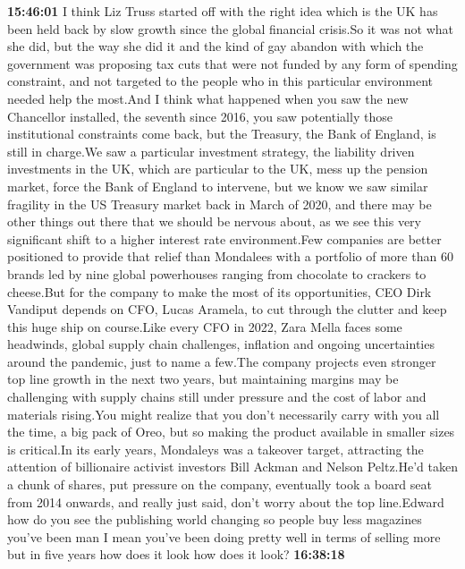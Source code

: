 \documentclass{article}%
\begin{document}
\textbf{15:46:01}%
I think Liz Truss started off with the right idea which is the UK has been held back by slow growth since the global financial crisis.So it was not what she did, but the way she did it and the kind of gay abandon with which the government was proposing tax cuts that were not funded by any form of spending constraint, and not targeted to the people who in this particular environment needed help the most.And I think what happened when you saw the new Chancellor installed, the seventh since 2016, you saw potentially those institutional constraints come back, but the Treasury, the Bank of England, is still in charge.We saw a particular investment strategy, the liability driven investments in the UK, which are particular to the UK, mess up the pension market, force the Bank of England to intervene, but we know we saw similar fragility in the US Treasury market back in March of 2020, and there may be other things out there that we should be nervous about, as we see this very significant shift to a higher interest rate environment.Few companies are better positioned to provide that relief than Mondalees with a portfolio of more than 60 brands led by nine global powerhouses ranging from chocolate to crackers to cheese.But for the company to make the most of its opportunities, CEO Dirk Vandiput depends on CFO, Lucas Aramela, to cut through the clutter and keep this huge ship on course.Like every CFO in 2022, Zara Mella faces some headwinds, global supply chain challenges, inflation and ongoing uncertainties around the pandemic, just to name a few.The company projects even stronger top line growth in the next two years, but maintaining margins may be challenging with supply chains still under pressure and the cost of labor and materials rising.You might realize that you don't necessarily carry with you all the time, a big pack of Oreo, but so making the product available in smaller sizes is critical.In its early years, Mondaleys was a takeover target, attracting the attention of billionaire activist investors Bill Ackman and Nelson Peltz.He'd taken a chunk of shares, put pressure on the company, eventually took a board seat from 2014 onwards, and really just said, don't worry about the top line.Edward how do you see the publishing world changing so people buy less magazines you've been man I mean you've been doing pretty well in terms of selling more but in five years how does it look how does it look?%
\textbf{16:38:18}%
\end{document}
